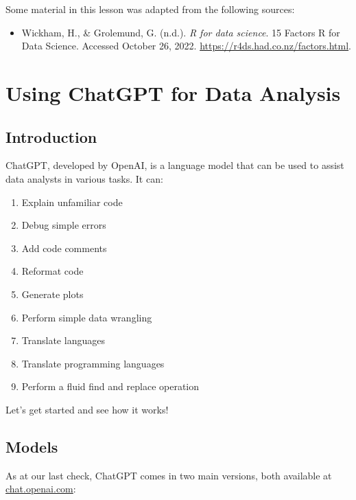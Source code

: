 \documentclass[
  letterpaper,
  DIV=11,
  numbers=noendperiod]{scrreprt}
\providecommand{\tightlist}{%
  \setlength{\itemsep}{0pt}\setlength{\parskip}{0pt}}\usepackage{longtable,booktabs,array}
\begin{document}
Some material in this lesson was adapted from the following sources:

\begin{itemize}
\tightlist
\item
  Wickham, H., \& Grolemund, G. (n.d.). \emph{R for data science}. 15
  Factors \textbar{} R for Data Science. Accessed October 26, 2022.
  \url{https://r4ds.had.co.nz/factors.html}.
\end{itemize}


\hypertarget{using-chatgpt-for-data-analysis}{%
\chapter{Using ChatGPT for Data
Analysis}\label{using-chatgpt-for-data-analysis}}

\hypertarget{introduction-8}{%
\section{Introduction}\label{introduction-8}}

ChatGPT, developed by OpenAI, is a language model that can be used to
assist data analysts in various tasks. It can:

\begin{enumerate}
\def\labelenumi{\arabic{enumi}.}
\tightlist
\item
  Explain unfamiliar code
\item
  Debug simple errors
\item
  Add code comments
\item
  Reformat code
\item
  Generate plots
\item
  Perform simple data wrangling
\item
  Translate languages
\item
  Translate programming languages
\item
  Perform a fluid find and replace operation
\end{enumerate}

Let's get started and see how it works!

\hypertarget{models}{%
\section{Models}\label{models}}

As at our last check, ChatGPT comes in two main versions, both available
at \href{https://chat.openai.com}{chat.openai.com}:
\end{document}
